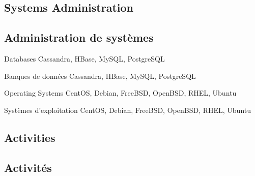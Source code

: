 \begin{minipage}[t]{0.04\maincolumnwidth}
\phantom{...}
\end{minipage}
\begin{minipage}[t]{0.48\maincolumnwidth}

\begin{langen}
\subsection{Systems Administration}
\end{langen}
\begin{langfr}
\subsection{Administration de syst\`{e}mes}
\end{langfr}

\begin{description}

\begin{langen}
\item[Databases] Cassandra, HBase, MySQL, PostgreSQL
\end{langen}
\begin{langfr}
\item[Banques de donn\'{e}es] Cassandra, HBase, MySQL, PostgreSQL
\end{langfr}

\vspace{2 mm}

\begin{langen}
\item[Operating Systems] CentOS, Debian, FreeBSD, OpenBSD, RHEL, Ubuntu
\end{langen}
\begin{langfr}
\item[Syst\`{e}mes d'exploitation] CentOS, Debian, FreeBSD, OpenBSD, RHEL, Ubuntu
\end{langfr}

\end{description}

\end{minipage}



\begin{langen}
\section{Activities}
\end{langen}
\begin{langfr}
\section{Activit\'{e}s}
\end{langfr}

